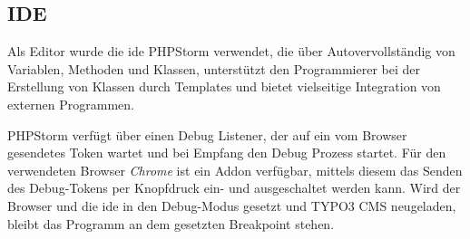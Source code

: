 \subsection{IDE}
Als Editor wurde die \gls{ide} PHPStorm verwendet, die über Autovervollständig von Variablen, Methoden und Klassen, unterstützt den Programmierer bei der Erstellung von Klassen durch Templates und bietet vielseitige Integration von externen Programmen.

PHPStorm verfügt über einen Debug Listener, der auf ein vom Browser gesendetes Token wartet und bei Empfang den Debug Prozess startet. Für den verwendeten Browser \textit{Chrome} ist ein Addon verfügbar, mittels diesem das Senden des Debug-Tokens per Knopfdruck ein- und ausgeschaltet werden kann. Wird der Browser und die \gls{ide} in den Debug-Modus gesetzt und TYPO3 CMS neugeladen, bleibt das Programm an dem gesetzten Breakpoint stehen.
